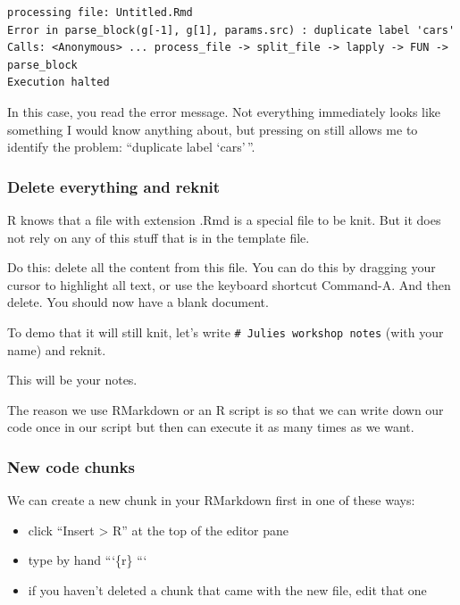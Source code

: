 \documentclass[]{book}
\providecommand{\tightlist}{%
  \setlength{\itemsep}{0pt}\setlength{\parskip}{0pt}}
\begin{document}
\begin{verbatim}
processing file: Untitled.Rmd
Error in parse_block(g[-1], g[1], params.src) : duplicate label 'cars'
Calls: <Anonymous> ... process_file -> split_file -> lapply -> FUN -> parse_block
Execution halted
\end{verbatim}

In this case, you read the error message. Not everything immediately looks like something I would know anything about, but pressing on still allows me to identify the problem: ``duplicate label `cars'\,''.

\hypertarget{delete-everything-and-reknit}{%
\subsubsection{Delete everything and reknit}\label{delete-everything-and-reknit}}

R knows that a file with extension .Rmd is a special file to be knit. But it does not rely on any of this stuff that is in the template file.

Do this: delete all the content from this file. You can do this by dragging your cursor to highlight all text, or use the keyboard shortcut Command-A. And then delete. You should now have a blank document.

To demo that it will still knit, let's write \texttt{\#\ Julie\textquotesingle{}s\ workshop\ notes} (with your name) and reknit.

This will be your notes.

The reason we use RMarkdown or an R script is so that we can write down our code once in our script but then can execute it as many times as we want.

\hypertarget{new-code-chunks}{%
\subsubsection{New code chunks}\label{new-code-chunks}}

We can create a new chunk in your RMarkdown first in one of these ways:

\begin{itemize}
\tightlist
\item
  click ``Insert \textgreater{} R'' at the top of the editor pane
\item
  type by hand
  ```\{r\}
  ```
\item
  if you haven't deleted a chunk that came with the new file, edit that one
\end{itemize}
\end{document}
